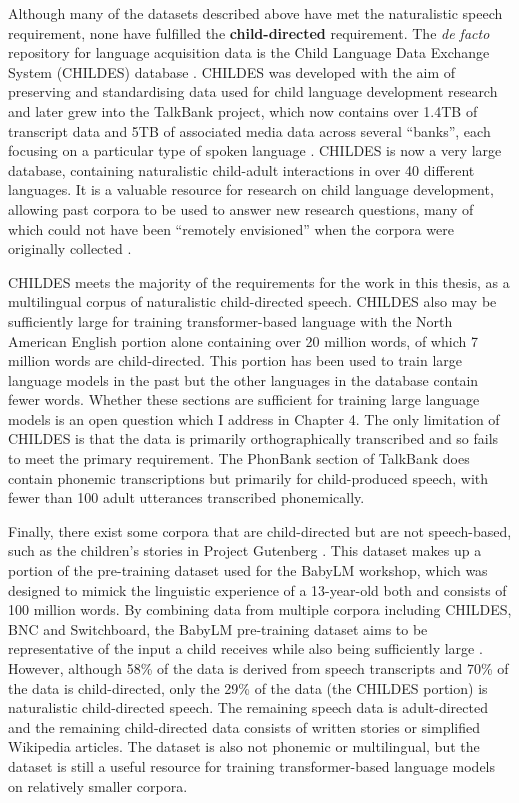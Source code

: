 Although many of the datasets described above have met the naturalistic speech requirement, none have fulfilled the \textbf{child-directed} requirement. The \emph{de facto} repository for language acquisition data is the Child Language Data Exchange System (CHILDES) database \citep{macwhinney1985child}. CHILDES was developed with the aim of preserving and standardising data used for child language development research and later grew into the TalkBank project, which now contains over 1.4TB of transcript data and 5TB of associated media data across several ``banks'', each focusing on a particular type of spoken language \citep{macwhinney_understanding_2019}. CHILDES is now a very large database, containing naturalistic child-adult interactions in over 40 different languages. It is a valuable resource for research on child language development, allowing past corpora to be used to answer new research questions, many of which could not have been ``remotely envisioned'' when the corpora were originally collected \citep{bernstein_ratner_augmenting_2024}. 

CHILDES meets the majority of the requirements for the work in this thesis, as a multilingual corpus of naturalistic child-directed speech. CHILDES also may be sufficiently large for training transformer-based language with the North American English portion alone containing over 20 million words, of which 7 million words are child-directed. This portion has been used to train large language models in the past \citep{huebner-etal-2021-babyberta} but the other languages in the database contain fewer words. Whether these sections are sufficient for training large language models is an open question which I address in Chapter 4. The only limitation of CHILDES is that the data is primarily orthographically transcribed and so fails to meet the primary requirement. The PhonBank section of TalkBank does contain phonemic transcriptions but primarily for child-produced speech, with fewer than 100 adult utterances transcribed phonemically. 

Finally, there exist some corpora that are child-directed but are not speech-based, such as the children's stories in Project Gutenberg \citep{gerlach2018standardizedprojectgutenbergcorpus}. This dataset makes up a portion of the pre-training dataset used for the BabyLM workshop, which was designed to mimick the linguistic experience of a 13-year-old both and consists of 100 million words. By combining data from multiple corpora including CHILDES, BNC and Switchboard, the BabyLM pre-training dataset aims to be representative of the input a child receives while also being sufficiently large \citep{choshen-et-al-2024-callforpapers-babylm2}. However, although 58\% of the data is derived from speech transcripts and 70\% of the data is child-directed, only the 29\% of the data (the CHILDES portion) is naturalistic child-directed speech. The remaining speech data is adult-directed and the remaining child-directed data consists of written stories or simplified Wikipedia articles. The dataset is also not phonemic or multilingual, but the dataset is still a useful resource for training transformer-based language models on relatively smaller corpora.

